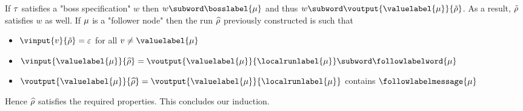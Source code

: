 If $\tau$ satisfies a "boss specification" $w$  then $w \subword \bosslabel{\node} $ and thus $w \subword \voutput{\valuelabel{\node}}{\Tilde{\run}}$.
As a result, $\Tilde{\rho}$ satisfies $w$ as well.
If $\mu$ is a "follower node" then the run $\widehat{\rho}$ previously constructed is such that  

\begin{itemize}	
	\item $\vinput{v}{\Tilde{\run}} = \epsilon$ for all $v \neq \valuelabel{\node}$
	
	\item $\vinput{\valuelabel{\node}}{\widehat{\run}} = \voutput{\valuelabel{\node}}{\localrunlabel{\node}} \subword \followlabelword{\node}$
	
	\item $\voutput{\valuelabel{\node}}{\widehat{\run}} = \voutput{\valuelabel{\node}}{\localrunlabel{\node}}$ contains $\followlabelmessage{\node}$
\end{itemize}

Hence $\widehat{\rho}$ satisfies the required properties.
This concludes our induction.